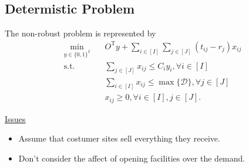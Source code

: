 \documentclass{beamer}
\newcommand{\T}{\mathrm{T}}
\newcommand{\Dcal}{\mathcal{D}}
\begin{document}
\subsection{Determistic Problem}
\begin{frame}[allowframebreaks]
	The non-robust problem is represented by
	\begin{subequations}
		\begin{align*}
			\min_{y \in \{0, 1\}^{I}} &\quad O^\T y + \sum_{i \in [I]} \sum_{j \in [J]} (t_{ij} - r_j) x_{ij} \\
			\text{s.t.} &\quad \sum_{j \in [J]} x_{ij} \le C_i y_i, \forall i \in [I]\\
			&\quad \sum_{i \in [I]} x_{ij} \le \max\{\Dcal\}, \forall j \in [J] \\
			&\quad x_{ij} \ge 0, \forall i \in [I], j \in [J].
		\end{align*}
	\end{subequations}
	
	\framebreak
	\centering
	\underline{Issues}
	\begin{itemize}
		\item Assume that costumer sites sell everything they receive.
		\item Don't consider the affect of opening facilities over the demand.
	\end{itemize}
\end{frame}
\end{document}
